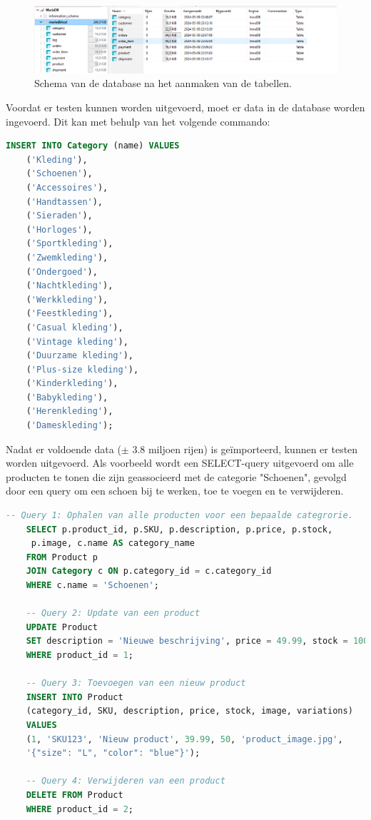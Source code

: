 \begin{figure}[H]
    \centering
    \includegraphics[width=\linewidth]{graphics/mariadb}
    \caption[Schema van de database na het aanmaken van de tabellen.]{Schema van de database na het aanmaken van de tabellen.}
    \label{fig:mariadb}
\end{figure}

Voordat er testen kunnen worden uitgevoerd, moet er data in de database worden ingevoerd. Dit kan met behulp van het volgende commando:

\begin{lstlisting}[language=SQL, caption={SQL-query voor het invoegen van nieuwe categorieën in de database.}]
    INSERT INTO Category (name) VALUES
    ('Kleding'),
    ('Schoenen'),
    ('Accessoires'),
    ('Handtassen'),
    ('Sieraden'),
    ('Horloges'),
    ('Sportkleding'),
    ('Zwemkleding'),
    ('Ondergoed'),
    ('Nachtkleding'),
    ('Werkkleding'),
    ('Feestkleding'),
    ('Casual kleding'),
    ('Vintage kleding'),
    ('Duurzame kleding'),
    ('Plus-size kleding'),
    ('Kinderkleding'),
    ('Babykleding'),
    ('Herenkleding'),
    ('Dameskleding');
\end{lstlisting}

Nadat er voldoende data ($\pm$ 3.8 miljoen rijen) is geïmporteerd, kunnen er testen worden uitgevoerd. Als voorbeeld wordt een SELECT-query uitgevoerd om alle producten te tonen die zijn geassocieerd met de categorie "Schoenen", gevolgd door een query om een schoen bij te werken, toe te voegen en te verwijderen.

\begin{lstlisting}[language=SQL, caption={SQL-queries voor het beheren van producten in de database.}]
    -- Query 1: Ophalen van alle producten voor een bepaalde categrorie.
    SELECT p.product_id, p.SKU, p.description, p.price, p.stock,
     p.image, c.name AS category_name
    FROM Product p
    JOIN Category c ON p.category_id = c.category_id
    WHERE c.name = 'Schoenen';
    
    -- Query 2: Update van een product
    UPDATE Product
    SET description = 'Nieuwe beschrijving', price = 49.99, stock = 100
    WHERE product_id = 1;
    
    -- Query 3: Toevoegen van een nieuw product
    INSERT INTO Product 
    (category_id, SKU, description, price, stock, image, variations)
    VALUES 
    (1, 'SKU123', 'Nieuw product', 39.99, 50, 'product_image.jpg', 
    '{"size": "L", "color": "blue"}');
    
    -- Query 4: Verwijderen van een product
    DELETE FROM Product
    WHERE product_id = 2;
\end{lstlisting}
